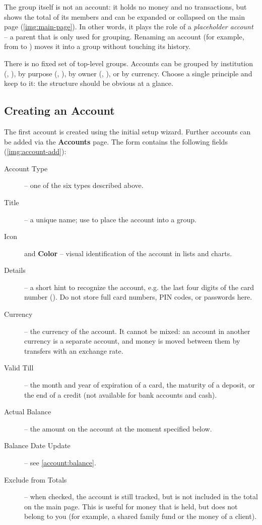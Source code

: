 \noindent The group  itself is not an account: it holds no money and no transactions,
but shows the total of its members and can be expanded or collapsed on the main page
(\cref{img:main-page}). In other words, it plays the role of a \emph{placeholder account} --
a parent that is only used for grouping. Renaming an account (for example, from  to
) moves it into a group without touching its history.

There is no fixed set of top-level groups. Accounts can be grouped by institution
(, ), by purpose (, ), by
owner (, ), or by currency. Choose a single principle and
keep to it: the structure should be obvious at a glance.


\subsection{Creating an Account}

The first account is created using the initial setup wizard. Further accounts can be added
via the \textbf{Accounts} page. The form contains the following fields
(\cref{img:account-add}):


\begin{description}
  \item[Account Type] -- one of the six types described above.
  \item[Title] -- a unique name; use \q{/} to place the account into a group.
  \item[Icon] and \textbf{Color} -- visual identification of the account in lists and charts.
  \item[Details] -- a short hint to recognize the account, e.g. the last four digits of the
  card number (). Do not store full card numbers, PIN codes, or passwords here.
  \item[Currency] -- the currency of the account. It cannot be mixed: an account in another
  currency is a separate account, and money is moved between them by transfers with an
  exchange rate.
  \item[Valid Till] -- the month and year of expiration of a card, the maturity of a deposit,
  or the end of a credit (not available for bank accounts and cash).
  \item[Actual Balance] -- the amount on the account at the moment specified below.
  \item[Balance Date Update] -- see \cref{account:balance}.
  \item[Exclude from Totals] -- when checked, the account is still tracked, but is not
  included in the total on the main page. This is useful for money that is held, but does not
  belong to you (for example, a shared family fund or the money of a client).
\end{description}

